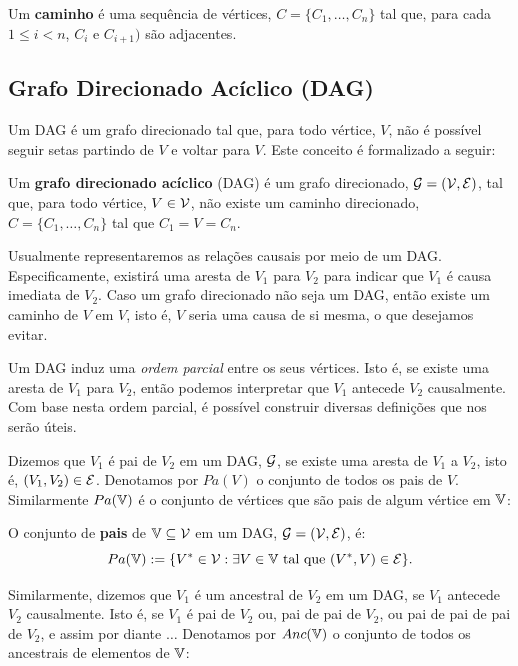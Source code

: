 \begin{definition}
 \label{def:caminho}
 Um \textbf{caminho} é uma sequência de vértices,
 $C = \{C_1, \ldots, C_n\}$ tal que, 
 para cada $1 \leq i < n$,
 $C_i$ e $C_{i+1})$ são adjacentes.
\end{definition}

\subsection{Grafo Direcionado Acíclico (DAG)}

Um DAG é um grafo direcionado tal que,
para todo vértice, $V$, não é possível
seguir setas partindo de $V$ e
voltar para $V$. Este conceito é
formalizado a seguir:

\begin{definition}
 \label{def:dag}
 Um \textbf{grafo direcionado acíclico} (DAG) é
 um grafo direcionado, ${\mathcal G} = ({\mathcal V}, {\mathcal E})$,
 tal que, para todo
 vértice, $V \in {\mathcal V}$, não existe um
 caminho direcionado, $C = \{C_1, \ldots, C_n\}$
 tal que $C_1 = V = C_n$.
\end{definition}

Usualmente representaremos
as relações causais por meio de um DAG.
Especificamente, existirá uma aresta de $V_1$ para $V_2$
para indicar que $V_1$ é causa imediata de $V_2$.
Caso um grafo direcionado não seja um DAG,
então existe um caminho de $V$ em $V$, isto é,
$V$ seria uma causa de si mesma, 
o que desejamos evitar.

Um DAG induz uma \textit{ordem parcial} entre 
os seus vértices. Isto é,
se existe uma aresta de $V_1$ para $V_2$,
então podemos interpretar que
$V_1$ antecede $V_2$ causalmente.
Com base nesta ordem parcial, é
possível construir diversas
definições que nos serão úteis.

Dizemos que $V_1$ é pai de $V_2$ em
um DAG, ${\mathcal G}$, se
existe uma aresta de $V_1$ a $V_2$,
isto é, $(V_1, V_2) \in {\mathcal E}$.
Denotamos por $Pa(V)$ o
conjunto de todos os pais de $V$.
Similarmente $Pa({\mathbb V})$ é o conjunto de vértices que
são pais de algum vértice em ${\mathbb V}$:

\begin{definition}
 \label{def:pais}
 O conjunto de \textbf{pais} de ${\mathbb V} \subseteq {\mathcal V}$ 
 em um DAG, ${\mathcal G} = ({\mathcal V}, {\mathcal E})$, é:
 $$Pa({\mathbb V}) := \{V^* \in {\mathcal V}: \exists V \in {\mathbb V} \text{ tal que } (V^*, V) \in {\mathcal E}\}.$$
\end{definition}

Similarmente, dizemos que $V_1$ é um ancestral de $V_2$ em
um DAG, se $V_1$ antecede $V_2$ causalmente. Isto é,
se $V_1$ é pai de $V_2$ ou, pai de pai de $V_2$, ou
pai de pai de pai de $V_2$, e assim por diante $\ldots$
Denotamos por $Anc({\mathbb V})$ o conjunto de 
todos os ancestrais de elementos de ${\mathbb V}$:

